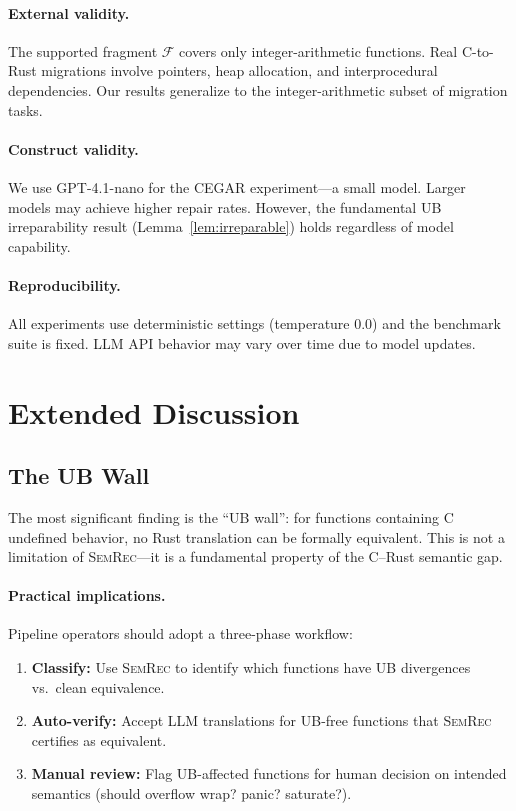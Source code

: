 \documentclass[11pt]{article}
\newcommand{\semrec}{\textsc{SemRec}}
\begin{document}
\paragraph{External validity.}
The supported fragment $\mathcal{F}$ covers only integer-arithmetic
functions.  Real C-to-Rust migrations involve pointers, heap allocation,
and interprocedural dependencies.  Our results generalize to the
integer-arithmetic subset of migration tasks.

\paragraph{Construct validity.}
We use GPT-4.1-nano for the CEGAR experiment---a small model.  Larger models
may achieve higher repair rates.  However, the fundamental UB irreparability
result (Lemma~\ref{lem:irreparable}) holds regardless of model capability.

\paragraph{Reproducibility.}
All experiments use deterministic settings (temperature 0.0) and the
benchmark suite is fixed.  LLM API behavior may vary over time due to
model updates.

\section{Extended Discussion}\label{app:discussion}

\subsection{The UB Wall}

The most significant finding is the ``UB wall'': for functions containing
C undefined behavior, no Rust translation can be formally equivalent.  This
is not a limitation of \semrec{}---it is a fundamental property of the
C--Rust semantic gap.

\paragraph{Practical implications.}
Pipeline operators should adopt a three-phase workflow:
\begin{enumerate}[nosep]
\item \textbf{Classify:} Use \semrec{} to identify which functions have UB
      divergences vs.\ clean equivalence.
\item \textbf{Auto-verify:} Accept LLM translations for UB-free functions
      that \semrec{} certifies as equivalent.
\item \textbf{Manual review:} Flag UB-affected functions for human decision
      on intended semantics (should overflow wrap? panic? saturate?).
\end{enumerate}
\end{document}
